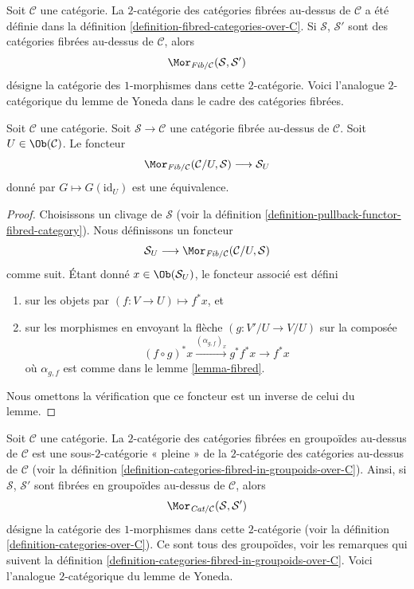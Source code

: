 \noindent
Soit $\mathcal{C}$ une catégorie. La $2$-catégorie des catégories fibrées
au-dessus de $\mathcal{C}$ a été définie dans la
définition \ref{definition-fibred-categories-over-C}.
Si $\mathcal{S}$, $\mathcal{S}'$ sont des catégories fibrées
au-dessus de $\mathcal{C}$, alors
$$
\Mor_{\textit{Fib}/\mathcal{C}}(\mathcal{S}, \mathcal{S}')
$$
désigne la catégorie des $1$-morphismes dans cette $2$-catégorie.
Voici l'analogue $2$-catégorique du lemme de Yoneda
dans le cadre des catégories fibrées.

\begin{lemma}
\label{lemma-yoneda-2category-fibred}
Soit $\mathcal{C}$ une catégorie.
Soit $\mathcal{S} \to \mathcal{C}$ une catégorie fibrée au-dessus de
$\mathcal{C}$.
Soit $U \in \Ob(\mathcal{C})$.
Le foncteur
$$
\Mor_{\textit{Fib}/\mathcal{C}}(\mathcal{C}/U, \mathcal{S})
\longrightarrow
\mathcal{S}_U
$$
donné par $G \mapsto G(\text{id}_U)$ est une équivalence.
\end{lemma}

\begin{proof}
Choisissons un clivage de $\mathcal{S}$
(voir la définition \ref{definition-pullback-functor-fibred-category}).
Nous définissons un foncteur
$$
\mathcal{S}_U
\longrightarrow
\Mor_{\textit{Fib}/\mathcal{C}}(\mathcal{C}/U, \mathcal{S})
$$
comme suit. Étant donné
$x \in \Ob(\mathcal{S}_U)$,
le foncteur associé est défini
\begin{enumerate}
\item sur les objets par $(f : V \to U) \mapsto f^*x$, et
\item sur les morphismes en envoyant la flèche
$(g : V'/U \to V/U)$ sur la composée
$$
(f \circ g)^*x \xrightarrow{(\alpha_{g, f})_x} g^*f^*x \rightarrow f^*x
$$
où $\alpha_{g, f}$ est comme dans le lemme \ref{lemma-fibred}.
\end{enumerate}
Nous omettons la vérification que ce foncteur est un inverse de celui du lemme.
\end{proof}

\noindent
Soit $\mathcal{C}$ une catégorie. La $2$-catégorie des catégories
fibrées en groupoïdes au-dessus de $\mathcal{C}$ est une sous-$2$-catégorie
« pleine » de la $2$-catégorie des catégories au-dessus de
$\mathcal{C}$ (voir la
définition \ref{definition-categories-fibred-in-groupoids-over-C}).
Ainsi, si $\mathcal{S}$, $\mathcal{S}'$ sont fibrées en groupoïdes
au-dessus de $\mathcal{C}$, alors
$$
\Mor_{\textit{Cat}/\mathcal{C}}(\mathcal{S}, \mathcal{S}')
$$
désigne la catégorie des $1$-morphismes dans cette $2$-catégorie
(voir la définition \ref{definition-categories-over-C}).
Ce sont tous des groupoïdes, voir les remarques qui suivent la
définition \ref{definition-categories-fibred-in-groupoids-over-C}.
Voici l'analogue $2$-catégorique du lemme de Yoneda.


